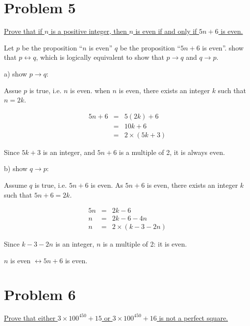 \documentclass[11pt]{article}
\begin{document}
{\newpage
	\section*{Problem 5} 

\underline{Prove that if $n$ is a positive integer, then $n$ is even if and only if $5n+6$ is even.}
	
	
	Let $p$ be the proposition ``$n$ is even'' \newline $q$ be the proposition ``$5n+6$ is even''.\newline
	 show that $p \leftrightarrow q$, which is logically equivalent to show that $p \rightarrow q$ and $q \rightarrow p$.
	
	a) show $p \rightarrow q$:
	
	Assue $p$ is true, i.e. $n$ is even.
	\noindent when $n$ is even, there exists an integer $k$ such that  $n = 2 k$.
	
	\begin{eqnarray*}
	5 n + 6 & = & 5 (2 k) + 6\\
	& = & 10 k + 6\\
	& = & 2 \times (5 k + 3)
	\end{eqnarray*}
	
	Since $5k+3$ is an integer, and $5 n + 6$ is a multiple of 2, it is always even.\newline
	
	b) show $q \rightarrow p$:
	
	Assume $q$ is true, i.e. $5n+6$ is even.
	\noindent As $5 n + 6$ is even,  there exists an integer $k$ such that $5n + 6 = 2 k$.
	
	\begin{eqnarray*}
	5 n & = & 2 k - 6\\
	n & = & 2k - 6 - 4n\\
	n & = & 2 \times (k - 3 - 2n) 
	\end{eqnarray*}
	
	Since $k - 3 - 2n$ is an integer, $n$ is a multiple of 2: it is even.
	
	 $n$ is even $\leftrightarrow 5n+6$ is even.
	\section*{Problem 6}
	\underline{Prove that either $3 \times 100^{450} + 15$ or $3 \times 100^{450} + 16$ is not a perfect square.}
	
}
\end{document}
